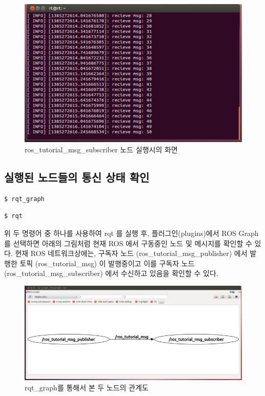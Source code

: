 \begin{figure}[h]
\centering\includegraphics[width=0.8\columnwidth]{pictures/chapter7/rosrun_ros_tutorial_msg_subscriber.png}
\caption{ros\_tutorial\_msg\_subscriber 노드 실행시의 화면}
\end{figure}

\newpage
\subsection{실행된 노드들의 통신 상태 확인}

\begin{lstlisting}[language=ROS]
$ rqt_graph
\end{lstlisting}

\begin{lstlisting}[language=ROS]
$ rqt
\end{lstlisting}

위 두 명령어 중 하나를 사용하여 rqt 를 실행 후, 플러그인(plugins)에서 ROS Graph 를 선택하면 아래의 그림처럼 현재 ROS 에서 구동중인 노드 및 메시지를 확인할 수 있다. 현재 ROS 네트워크상에는, 구독자 노드 (ros\_tutorial\_msg\_publisher) 에서 발행한 토픽 (ros\_tutorial\_msg) 이 발행중이고 이를 구독자 노드 (ros\_tutorial\_msg\_subscriber) 에서 수신하고 있음을 확인할 수 있다.

\begin{figure}[h]
\centering\includegraphics[width=0.7\columnwidth]{pictures/chapter7/rqt_graph_oroca_ros_tutorials.png}
\caption{rqt\_graph를 통해서 본 두 노드의 관계도}
\end{figure}

